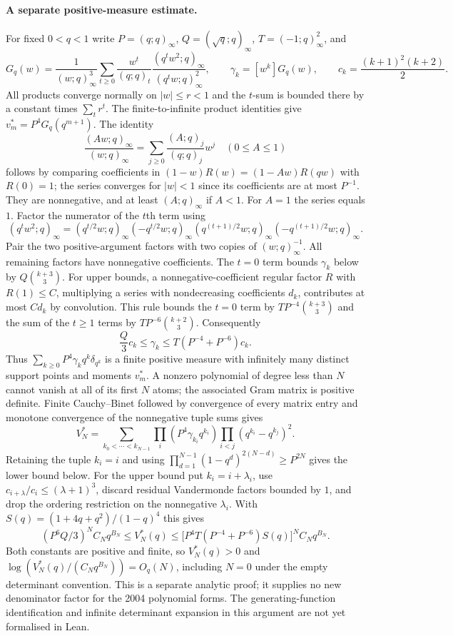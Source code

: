 \documentclass[11pt]{article}
\begin{document}
\paragraph{A separate positive-measure estimate.}
For fixed $0<q<1$ write $P=(q;q)_\infty$, $Q=(\sqrt q;q)_\infty$,
$T=(-1;q)_\infty^2$, and
\[
 G_q(w)=\frac1{(w;q)_\infty^3}\sum_{t\ge0}\frac{w^t}{(q;q)_t}
          \frac{(q^tw^2;q)_\infty}{(q^tw;q)_\infty^2},
 \qquad \gamma_k=[w^k]G_q(w),\qquad c_k=\frac{(k+1)^2(k+2)}2.
\]
All products converge normally on $|w|\le r<1$ and the $t$-sum is bounded
there by a constant times $\sum_t r^t$.  The finite-to-infinite product
identities give $v_m^*=P^4G_q(q^{m+1})$.
The identity
\[
 \frac{(Aw;q)_\infty}{(w;q)_\infty}
   =\sum_{j\ge0}\frac{(A;q)_j}{(q;q)_j}w^j\quad(0\le A\le1)
\]
follows by comparing coefficients in
$(1-w)R(w)=(1-Aw)R(qw)$ with $R(0)=1$; the series converges for $|w|<1$
since its coefficients are at most $P^{-1}$.  They are nonnegative, and
at least $(A;q)_\infty$ if $A<1$.  For $A=1$ the series equals $1$.
Factor the numerator of the $t$th term using
\[
 (q^tw^2;q)_\infty=(q^{t/2}w;q)_\infty(-q^{t/2}w;q)_\infty
 (q^{(t+1)/2}w;q)_\infty(-q^{(t+1)/2}w;q)_\infty.
\]
Pair the two positive-argument factors with two copies of
$(w;q)_\infty^{-1}$.  All remaining factors have nonnegative
coefficients.  The $t=0$ term bounds $\gamma_k$ below by
$Q\binom{k+3}3$.  For upper bounds, a nonnegative-coefficient regular
factor $R$ with $R(1)\le C$, multiplying a series with nondecreasing
coefficients $d_k$, contributes at most $Cd_k$ by convolution.
This rule bounds the $t=0$ term by $TP^{-4}\binom{k+3}3$ and the sum
of the $t\ge1$ terms by $TP^{-6}\binom{k+2}3$.  Consequently
\[
 \frac Q3 c_k\le\gamma_k\le T(P^{-4}+P^{-6})c_k.
\]
Thus $\sum_{k\ge0}P^4\gamma_kq^k\delta_{q^k}$ is a finite positive measure
with infinitely many distinct support points and moments $v_m^*$.
A nonzero polynomial of degree less than $N$ cannot vanish at all of its
first $N$ atoms; the associated Gram matrix is positive definite.
Finite Cauchy--Binet followed by convergence of every matrix entry and
monotone convergence of the nonnegative tuple sums gives
\[
 V_N^*=\sum_{k_0<\cdots<k_{N-1}}
 \prod_i(P^4\gamma_{k_i}q^{k_i})\prod_{i<j}(q^{k_i}-q^{k_j})^2.
\]
Retaining the tuple $k_i=i$ and using
$\prod_{d=1}^{N-1}(1-q^d)^{2(N-d)}\ge P^{2N}$ gives the lower bound
below.  For the upper bound put $k_i=i+\lambda_i$, use
$c_{i+\lambda}/c_i\le(\lambda+1)^3$, discard residual Vandermonde factors
bounded by $1$, and drop the ordering restriction on the nonnegative
$\lambda_i$.  With $S(q)=(1+4q+q^2)/(1-q)^4$ this gives
\[
 (P^6Q/3)^N C_Nq^{B_N}\le V_N^*(q)
 \le\bigl[P^4T(P^{-4}+P^{-6})S(q)\bigr]^N C_Nq^{B_N}.
\]
Both constants are positive and finite, so $V_N^*(q)>0$ and
$\log(V_N^*(q)/(C_Nq^{B_N}))=O_q(N)$, including $N=0$ under the empty
determinant convention.  This is a separate analytic proof; it supplies no
new denominator factor for the 2004 polynomial forms.
The generating-function identification and infinite determinant expansion
in this argument are not yet formalised in Lean.
\end{document}
